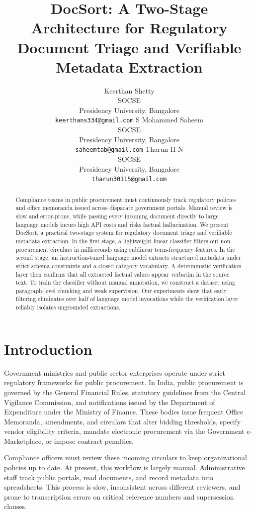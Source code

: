 \documentclass{article}
\title{DocSort: A Two-Stage Architecture for Regulatory Document Triage and Verifiable Metadata Extraction}
\author{
  Keerthan Shetty \\
  \normalfont\footnotesize SOCSE \\
  \normalfont\footnotesize Presidency University, Bangalore \\
  {\footnotesize\texttt{keerthans334@gmail.com}}
  \And
  S Mohammed Saheem \\
  \normalfont\footnotesize SOCSE \\
  \normalfont\footnotesize Presidency University, Bangalore \\
  {\footnotesize\texttt{saheemtab@gmail.com}}
  \And
  Tharun H N \\
  \normalfont\footnotesize SOCSE \\
  \normalfont\footnotesize Presidency University, Bangalore \\
  {\footnotesize\texttt{tharun30115@gmail.com}}
}
\begin{document}
\maketitle

\begin{abstract}
\fontsize{11pt}{14.5pt}\selectfont
Compliance teams in public procurement must continuously track regulatory policies and office memoranda issued across disparate government portals. Manual review is slow and error-prone, while passing every incoming document directly to large language models incurs high API costs and risks factual hallucination. We present DocSort, a practical two-stage system for regulatory document triage and verifiable metadata extraction. In the first stage, a lightweight linear classifier filters out non-procurement circulars in milliseconds using sublinear term-frequency features. In the second stage, an instruction-tuned language model extracts structured metadata under strict schema constraints and a closed category vocabulary. A deterministic verification layer then confirms that all extracted factual values appear verbatim in the source text. To train the classifier without manual annotation, we construct a dataset using paragraph-level chunking and weak supervision. Our experiments show that early filtering eliminates over half of language model invocations while the verification layer reliably isolates ungrounded extractions.
\end{abstract}
\vspace{2.5ex}

\section{Introduction}

Government ministries and public sector enterprises operate under strict regulatory frameworks for public procurement. In India, public procurement is governed by the General Financial Rules, statutory guidelines from the Central Vigilance Commission, and notifications issued by the Department of Expenditure under the Ministry of Finance. These bodies issue frequent Office Memoranda, amendments, and circulars that alter bidding thresholds, specify vendor eligibility criteria, mandate electronic procurement via the Government e-Marketplace, or impose contract penalties.

Compliance officers must review these incoming circulars to keep organizational policies up to date. At present, this workflow is largely manual. Administrative staff track public portals, read documents, and record metadata into spreadsheets. This process is slow, inconsistent across different reviewers, and prone to transcription errors on critical reference numbers and supersession clauses.
\end{document}
